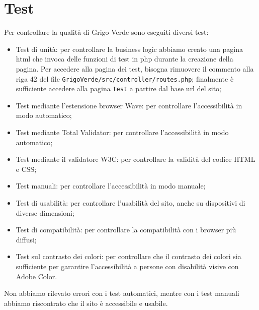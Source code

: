 \section{Test}
\label{sec:test}

Per controllare la qualità di Grigo Verde sono eseguiti diversi test:
\begin{itemize}
	\item Test di unità: per controllare la business logic abbiamo creato una
	      pagina html che invoca delle funzioni di test in php durante la
	      creazione della pagina. Per accedere alla pagina dei test, bisogna
	      rimuovere il commento alla riga 42 del file
	      \texttt{GrigoVerde/src/controller/routes.php}; finalmente è
	      sufficiente accedere alla pagina \texttt{test} a partire dal base url
	      del sito;

	\item Test mediante l'estensione browser Wave: per controllare
	      l'accessibilità in modo automatico;

	\item Test mediante Total Validator: per controllare l'accessibilità in modo
	      automatico;

	\item Test mediante il validatore W3C: per controllare la validità del codice
	      HTML e CSS;

	\item Test manuali: per controllare l'accessibilità in modo manuale;

	\item Test di usabilità: per controllare l'usabilità del sito, anche su
	      dispositivi di diverse dimensioni;

	\item Test di compatibilità: per controllare la compatibilità con i browser
	      più diffusi;

	\item Test sul contrasto dei colori: per controllare che il contrasto dei
	      colori sia sufficiente per garantire l'accessibilità a persone con
	      disabilità visive con Adobe Color.
\end{itemize}

Non abbiamo rilevato errori con i test automatici, mentre con i test manuali
abbiamo riscontrato che il sito è accessibile e usabile.
